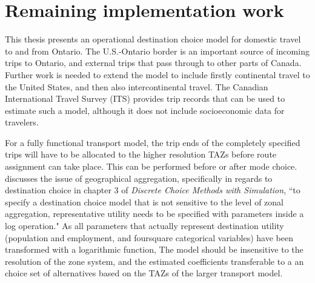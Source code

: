 
\section{Remaining implementation work}
This thesis presents an operational destination choice model for domestic travel to and from Ontario. The U.S.-Ontario border is an important source of incoming trips to Ontario, and external trips that pass through to other parts of Canada. Further work is needed to extend the model to include firstly continental travel to the United States, and then also intercontinental travel. The Canadian International Travel Survey (ITS) provides trip records that can be used to estimate such a model, although it does not include socioeconomic data for travelers. 

For a fully functional transport model, the trip ends of the completely specified trips will have to be allocated to the higher resolution TAZs before route assignment can take place. This can be performed before or after mode choice. \textcite{Train09} discusses the issue of geographical aggregation, specifically in regards to destination choice in chapter 3 of \textit{Discrete Choice Methods with Simulation}, 
``to specify a destination choice model that is not sensitive to the level of zonal aggregation, representative utility needs to be specified with parameters inside a log operation."
As all parameters that actually represent destination utility (population and employment, and foursquare categorical variables) have been transformed with a logarithmic function, The model should be insensitive to the resolution of the zone system, and the estimated coefficients transferable to a an choice set of alternatives based on the TAZs of the larger transport model.
